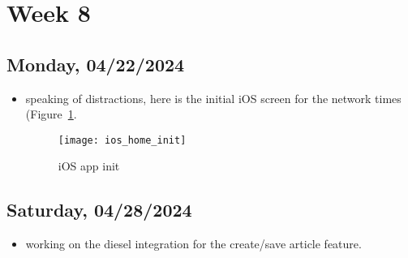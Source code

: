 \newpage
\section{Week 8}
\subsection*{Monday, 04/22/2024}
\begin{itemize}
    \item speaking of distractions, here is the initial iOS screen for the
        network times (Figure~\ref{fig:ios_home_init}. 
        \begin{figure}[ht]
            \centering
            \texttt{[image: ios\_home\_init]}
            \captionsetup{labelfont=bf, textfont=it}
            \caption{iOS app init}
            \label{fig:ios_home_init}
        \end{figure}
\end{itemize}

\subsection*{Saturday, 04/28/2024}
\begin{itemize}
    \item working on the diesel integration for the create/save article feature.
\end{itemize}
